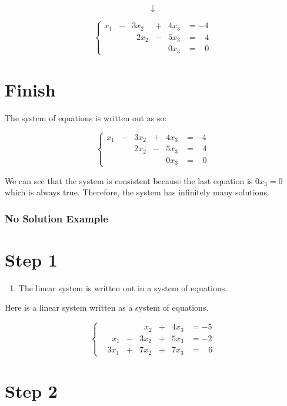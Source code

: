 \documentclass[
  letterpaper,
  DIV=11,
  numbers=noendperiod]{scrreprt}
\providecommand{\tightlist}{%
  \setlength{\itemsep}{0pt}\setlength{\parskip}{0pt}}\usepackage{longtable,booktabs,array}
\begin{document}
\[
\downarrow
\]

\[
\begin{cases}
x_1 &- &3x_2 &+ &4x_3 &= -4 \\
& &\;\;2x_2 &- &5x_3 &= \;\;\;4 \\
& & & &0x_3 &= \;\;\;0
\end{cases}
\]

\chapter{Finish}

The system of equations is written out as so:

\[
\begin{cases}
x_1 &- &3x_2 &+ &4x_3 &= -4 \\
& &2x_2 &- &5x_3 &= \;\;\;4 \\
& & & &0x_3 &= \;\;\;0
\end{cases}
\]

We can see that the system is consistent because the last equation is
\(0x_3 = 0\) which is always true. Therefore, the system has infinitely
many solutions.

\hypertarget{no-solution-example}{%
\subsection*{No Solution Example}\label{no-solution-example}}

\chapter{Step 1}

\begin{enumerate}
\def\labelenumi{\arabic{enumi}.}
\tightlist
\item
  The linear system is written out in a system of equations.
\end{enumerate}

Here is a linear system written as a system of equations.

\[
\begin{cases}
& & &\;\;x_2 &+ &4x_3 &= -5 \\
&\;\;x_1 &- &3x_2 &+ &5x_3 &= -2 \\
&3x_1 &+ &7x_2 &+ &7x_3 &= \;\;\;6
\end{cases}
\]

\chapter{Step 2}
\end{document}
